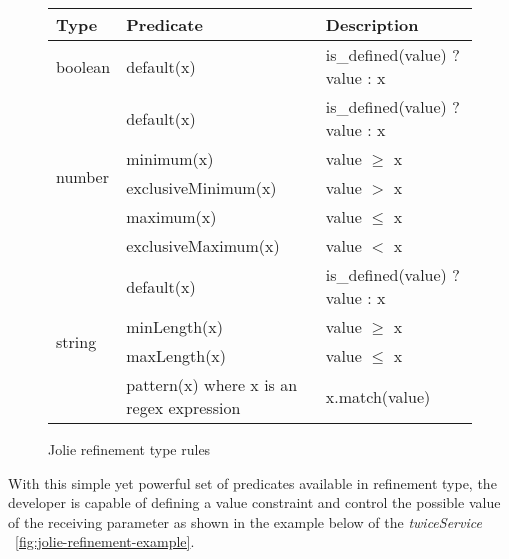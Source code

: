 \begin{figure}[ht]
    \begin{tabular}{ |l|l|l| }
        \hline
        Type    & Predicate                                            & Description                   \\
        \hline
        boolean & default(x)                                           & is_defined(value) ? value : x \\
        \hline
        \multirow{5}{4em}{number}
                & default(x)                                           & is_defined(value) ? value : x \\
                & minimum(x)                                           & value $\ge$ x                 \\
                & exclusiveMinimum(x)                                  & value $>$ x                   \\
                & maximum(x)                                           & value $\le$ x                 \\
                & exclusiveMaximum(x)                                  & value $<$ x                   \\
        \hline
        \multirow{4}{4em}{string}
                & default(x)                                           & is_defined(value) ? value : x \\
                & minLength(x)                                         & value $\ge$ x                 \\
                & maxLength(x)                                         & value $\le$ x                 \\
                & pattern(x) \footnotesize{where x is an regex expression} & x.match(value)                \\
        \hline
    \end{tabular}
    \caption{Jolie refinement type rules}
    \label{fig:jolie-refinement-rules}
\end{figure}

With this simple yet powerful set of predicates available in refinement type, the developer is capable of defining a value constraint and control the possible value of the receiving parameter as shown in the example below of the \textit{twiceService} ~\ref{fig:jolie-refinement-example}.

